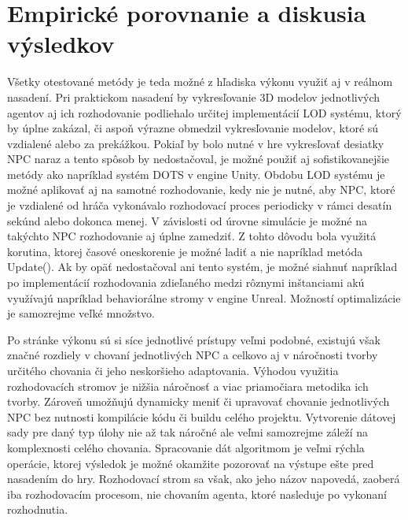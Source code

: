 \documentclass[slovak, master]{diploma}
\begin{document}
\section{Empirické porovnanie a diskusia výsledkov}
\label{sec:Discussion}
Všetky otestované metódy je teda možné z hľadiska výkonu využiť aj v reálnom nasadení. Pri praktickom nasadení by vykresľovanie 3D modelov jednotlivých agentov aj ich rozhodovanie podliehalo určitej implementácií LOD systému, ktorý by úplne zakázal, či aspoň výrazne obmedzil vykresľovanie modelov, ktoré sú vzdialené alebo za prekážkou. Pokiaľ by bolo nutné v hre vykresľovať desiatky NPC naraz a tento spôsob by nedostačoval, je možné použiť aj sofistikovanejšie metódy ako napríklad systém DOTS v engine Unity. Obdobu LOD systému je možné aplikovať aj na samotné rozhodovanie, kedy nie je nutné, aby NPC, ktoré je vzdialené od hráča vykonávalo rozhodovací proces periodicky v rámci desatín sekúnd alebo dokonca menej. V závislosti od úrovne simulácie je možné na takýchto NPC rozhodovanie aj úplne zamedziť. Z tohto dôvodu bola využitá korutina, ktorej časové oneskorenie je možné ladiť a nie napríklad metóda Update(). Ak by opäť nedostačoval ani tento systém, je možné siahnuť napríklad po implementácií rozhodovania zdieľaného medzi rôznymi inštanciami akú využívajú napríklad behaviorálne stromy v engine Unreal. Možností optimalizácie je samozrejme veľké množstvo.

Po stránke výkonu sú si síce jednotlivé prístupy veľmi podobné, existujú však značné rozdiely v chovaní jednotlivých NPC a celkovo aj v náročnosti tvorby určitého chovania či jeho neskoršieho adaptovania. Výhodou využitia rozhodovacích stromov je nižšia náročnosť a viac priamočiara metodika ich tvorby. Zároveň umožňujú dynamicky meniť či upravovať chovanie jednotlivých NPC bez nutnosti kompilácie kódu či buildu celého projektu. Vytvorenie dátovej sady pre daný typ úlohy nie až tak náročné ale veľmi samozrejme záleží na komplexnosti celého chovania. Spracovanie dát algoritmom je veľmi rýchla operácie, ktorej výsledok je možné okamžite pozorovať na výstupe ešte pred nasadením do hry. Rozhodovací strom sa však, ako jeho názov napovedá, zaoberá iba rozhodovacím procesom, nie chovaním agenta, ktoré nasleduje po vykonaní rozhodnutia. 
\end{document}
